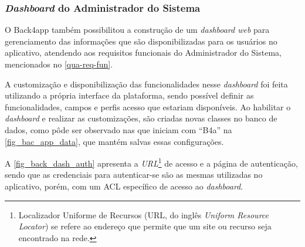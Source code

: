 \newpage

\subsubsection{\emph{Dashboard} do Administrador do Sistema}

O Back4app também possibilitou a construção de um \emph{dashboard web} para gerenciamento das informações que são disponibilizadas
para os usuários no aplicativo, atendendo aos requisitos funcionais do Administrador do Sistema, mencionados no \autoref{qua-req-fun}.

A customização e disponibilização das funcionalidades nesse \emph{dashboard} foi feita utilizando a própria
interface da plataforma, sendo possível definir as funcionalidades, campos e perfis acesso que estariam
disponíveis. Ao habilitar o \emph{dashboard} e realizar as customizações, são criadas novas classes no banco
de dados, como pôde ser observado nas que iniciam com ``B4a'' na \autoref{fig_bac_app_data}, que mantém salvas
essas configurações.

A \autoref{fig_back_dash_auth} apresenta a \emph{URL}\footnote{Localizador Uniforme de Recursos (URL, do inglês \emph{Uniform
        Resource Locator}) se refere ao endereço que permite que um site ou recurso seja encontrado na rede.}
de acesso e a página de autenticação, sendo que as credenciais para autenticar-se são as mesmas utilizadas no aplicativo, porém, com um ACL específico de acesso ao \emph{dashboard}.

